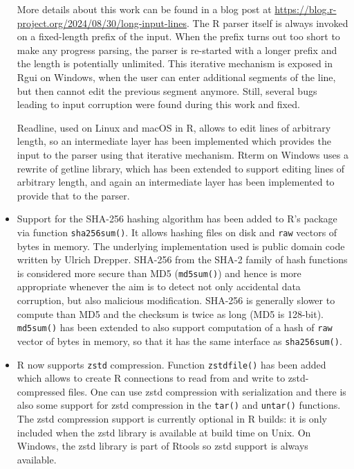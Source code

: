 \begin{itemize}
  More details about this work can be found in a blog post at
  \url{https://blog.r-project.org/2024/08/30/long-input-lines}. The R parser
  itself is always invoked on a fixed-length prefix of the input. When the
  prefix turns out too short to make any progress parsing, the parser is
  re-started with a longer prefix and the length is potentially unlimited.
  This iterative mechanism is exposed in Rgui on Windows, when the user can
  enter additional segments of the line, but then cannot edit the previous
  segment anymore. Still, several bugs leading to input corruption were
  found during this work and fixed.

  Readline, used on Linux and macOS in R, allows to edit lines of arbitrary
  length, so an intermediate layer has been implemented which provides the
  input to the parser using that iterative mechanism. Rterm on Windows uses
  a rewrite of getline library, which has been extended to support editing
  lines of arbitrary length, and again an intermediate layer has been
  implemented to provide that to the parser.
\item
  Support for the SHA-256 hashing algorithm has been added to R's 
  package via function \texttt{sha256sum()}. It allows hashing files on disk and
  \texttt{raw} vectors of bytes in memory. The underlying implementation used is
  public domain code written by Ulrich Drepper. SHA-256 from the SHA-2
  family of hash functions is considered more secure than MD5 (\texttt{md5sum()})
  and hence is more appropriate whenever the aim is to detect not only
  accidental data corruption, but also malicious modification. SHA-256 is
  generally slower to compute than MD5 and the checksum is twice as long
  (MD5 is 128-bit). \texttt{md5sum()} has been extended to also support
  computation of a hash of \texttt{raw} vector of bytes in memory, so that it has
  the same interface as \texttt{sha256sum()}.
\item
  R now supports \texttt{zstd} compression. Function \texttt{zstdfile()} has been added
  which allows to create R connections to read from and write to
  zstd-compressed files. One can use zstd compression with serialization
  and there is also some support for zstd compression in the \texttt{tar()} and
  \texttt{untar()} functions. The zstd compression support is currently optional
  in R builds: it is only included when the zstd library is available at
  build time on Unix. On Windows, the zstd library is part of Rtools so zstd
  support is always available.


\end{itemize}
